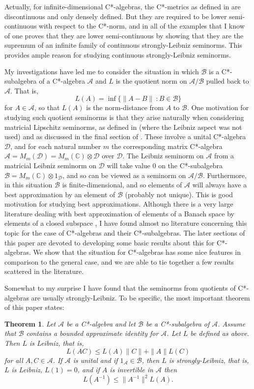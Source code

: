 \documentclass[12pt]{amsart}
\newcommand{\<}{\langle}
\renewcommand{\>}{\rangle}
\newcommand{\cA}{{\mathcal A}}
\newcommand{\cB}{{\mathcal B}}
\newcommand{\cD}{{\mathcal D}}
\newcommand{\bC}{{\mathbb C}}
\newtheorem*{thmnonum}{Theorem}
\theoremstyle{definition}   %
\begin{document}
Actually, for infinite-dimensional C*-algebras, the C*-metrics as defined in\cite{R21}
are discontinuous and only densely defined. But they are required
to be lower semi-continuous with
respect to the C*-norm, and in all of the examples that I know of one proves that they are
lower semi-continuous by showing that they are the supremum of an infinite
family of continuous strongly-Leibniz seminorms. This provides ample reason for
studying continuous strongly-Leibniz seminorms.

My investigations have led me to consider the situation in which $\cB$ is a C*-subalgebra 
of a C*-algebra $\cA$ and $L$ is the quotient norm on $\cA/\cB$ pulled back to $\cA$.
That is,
\[
L(A) = \inf \{\|A-B\|\  :  B \in \cB\}  
\]
for $A \in \cA$, so that $L(A)$ is the norm-distance from $A$ to $\cB$. One motivation 
for studying such quotient seminorms is that they arise naturally when considering
matricial Lipschitz seminorms, as defined in \cite{Wuw1, Wuw2, Wuw3} (where
the Leibniz aspect was not used)
and as discussed in the
final section of \cite{R21}. These involve a unital C*-algebra $\cD$, and for
each natural number $m$ the corresponding matrix C*-algebra 
$\cA = M_m(\cD) = M_m(\bC) \otimes \cD$ over $\cD$. The 
Leibniz seminorm on $\cA$ from a matricial
Leibniz seminorm on $\cD$ will take value 0 on the C*-subalgebra
$\cB = M_m(\bC) \otimes 1_\cD$, and so can be viewed as a seminorm
on $\cA/\cB$. 
Furthermore, in this situation $\cB$ is finite-dimensional,
and so elements of $\cA$ will always have a best approximation by an element
of $\cB$ (probably not unique). This is good motivation for studying best 
approximations. Although there is a 
very large literature dealing with best approximation of elements of a Banach
space by elements of a closed subspace \cite{Sng}, I have found almost no literature
concerning this topic for the case of C*-algebras and their C*-subalgebras. 
The later sections of this paper are devoted to developing some basic results
about this for C*-algebras. We show that the situation for C*-algebras has
some nice features in comparison to the general case, and we are able
to tie together a few results scattered in the literature.

Somewhat to my surprise I have found that the seminorms from quotients
of C*-algebras are usually strongly-Leibniz. To be specific, the most important
theorem of this paper states:

\begin{thmnonum}
\label{thmMainintro} 
Let $\cA$ be a C*-algebra and let $\cB$ be a C*-subalgebra of $\cA$. 
Assume that $\cB$ contains a bounded approximate identity for $\cA$.
Let $L$ be defined as above. Then $L$ is Leibniz, that
is,
\[
L(AC) \leq L(A)\|C\| + \|A\|L(C)
\]
for all $A, C \in \cA$. If $\cA$ is unital and if $1_\cA \in \cB$, then $L$ is
strongly-Leibniz, that is, $L$ is Leibniz, $L(1) = 0$, and
if $A$ is invertible in $\cA$ then
\[
L(A^{-1}) \leq \|A^{-1}\|^2L(A)  .
\]
\end{thmnonum}
\end{document}
